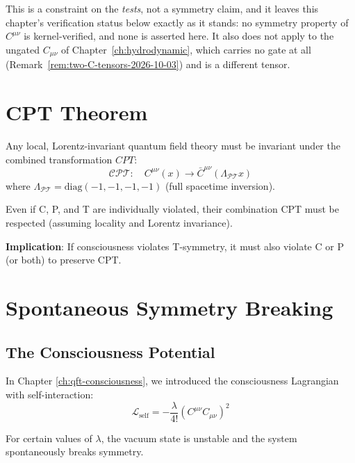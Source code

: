 \begin{level3}
This is a constraint on the \emph{tests}, not a symmetry claim, and it leaves
this chapter's verification status below exactly as it stands: no symmetry
property of $C^{\mu\nu}$ is kernel-verified, and none is asserted here. It also
does not apply to the ungated $C_{\mu\nu}$ of
Chapter~\ref{ch:hydrodynamic}, which carries no gate at all
(Remark~\ref{rem:two-C-tensors-2026-10-03}) and is a different tensor.
\end{level3}

\section{CPT Theorem}

\begin{theorem}\label{thm:cpt-consciousness}
Any local, Lorentz-invariant quantum field theory must be invariant under the combined transformation $CPT$:
\begin{equation}
\mathcal{C}\mathcal{P}\mathcal{T}: \quad C^{\mu\nu}(x) \to \bar{C}^{\mu\nu}(\Lambda_{\mathcal{P}\mathcal{T}} x)
\end{equation}
where $\Lambda_{\mathcal{P}\mathcal{T}} = \text{diag}(-1, -1, -1, -1)$ (full spacetime inversion).
\end{theorem}

Even if C, P, and T are individually violated, their combination CPT must be respected (assuming locality and Lorentz invariance).

\textbf{Implication}: If consciousness violates T-symmetry, it must also violate C or P (or both) to preserve CPT.

\section{Spontaneous Symmetry Breaking}

\subsection{The Consciousness Potential}

In Chapter \ref{ch:qft-consciousness}, we introduced the consciousness Lagrangian with self-interaction:
\begin{equation}
\mathcal{L}_{\text{self}} = -\frac{\lambda}{4!}\left( C^{\mu\nu}C_{\mu\nu} \right)^2
\end{equation}

For certain values of $\lambda$, the vacuum state is unstable and the system spontaneously breaks symmetry.

